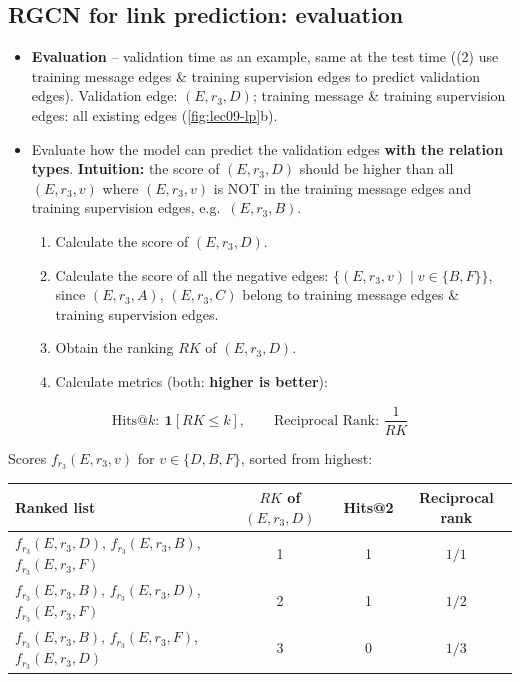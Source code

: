 \subsection{RGCN for link prediction: evaluation}\label{sec:lec09-lpeval}

\begin{itemize}
  \item \textbf{Evaluation} -- validation time as an example, same at the test
    time ((2) use training message edges \& training supervision edges to
    predict validation edges). Validation edge: $(E,r_3,D)$; training message \&
    training supervision edges: all existing edges (\cref{fig:lec09-lp}b).
  \item Evaluate how the model can predict the validation edges \textbf{with the
    relation types}. \textbf{Intuition:} the score of $(E,r_3,D)$ should be
    higher than all $(E,r_3,v)$ where $(E,r_3,v)$ is NOT in the training message
    edges and training supervision edges, e.g.\ $(E,r_3,B)$.
    \begin{enumerate}[label=\arabic*.]
      \item Calculate the score of $(E,r_3,D)$.
      \item Calculate the score of all the negative edges:
        $\{(E,r_3,v)\mid v\in\{B,F\}\}$, since $(E,r_3,A)$, $(E,r_3,C)$ belong
        to training message edges \& training supervision edges.
      \item Obtain the ranking $RK$ of $(E,r_3,D)$.
      \item Calculate metrics (both: \textbf{higher is better}):
    \end{enumerate}
\end{itemize}
\begin{equation}\label{eq:lec09-metrics}
  \text{Hits@}k:\ \mathbf{1}[RK\le k],
  \qquad
  \text{Reciprocal Rank: } \frac{1}{RK}
\end{equation}

\noindent\begin{minipage}{\linewidth}
\begin{example}
  Scores $f_{r_3}(E,r_3,v)$ for $v\in\{D,B,F\}$, sorted from highest:
  \begin{center}\small
    \begin{tabular}{@{}lccc@{}}
      \toprule
      Ranked list & $RK$ of $(E,r_3,D)$ & Hits@2 & Reciprocal rank\\
      \midrule
      $f_{r_3}(E,r_3,D)$, $f_{r_3}(E,r_3,B)$, $f_{r_3}(E,r_3,F)$ & 1 & 1 & $1/1$\\
      $f_{r_3}(E,r_3,B)$, $f_{r_3}(E,r_3,D)$, $f_{r_3}(E,r_3,F)$ & 2 & 1 & $1/2$\\
      $f_{r_3}(E,r_3,B)$, $f_{r_3}(E,r_3,F)$, $f_{r_3}(E,r_3,D)$ & 3 & 0 & $1/3$\\
      \bottomrule
    \end{tabular}
  \end{center}
\end{example}
\end{minipage}

